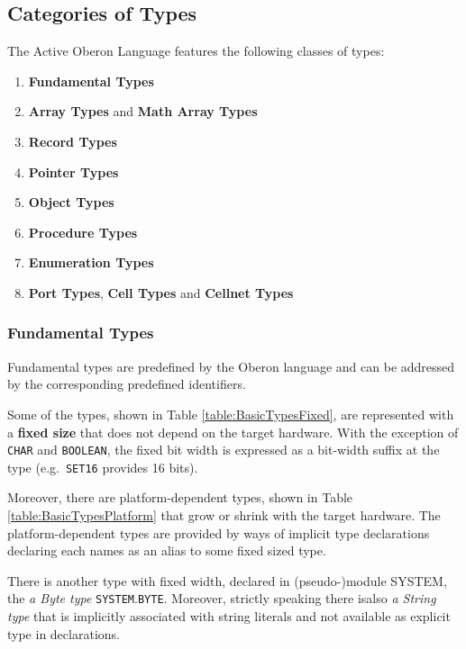\documentclass[a4wide,11pt]{article}
\newcommand{\SYSTEM}{\lstinline"SYSTEM"}
\newcommand{\BYTE}{\lstinline"BYTE"}
\begin{document}
\subsection{Categories of Types}

The Active Oberon Language features the following classes of types:
\begin{enumerate}
\renewcommand{\labelenumi}{(\roman{enumi})}
\item {\bf Fundamental Types}
\item {\bf Array Types} and {\bf Math Array Types}
\item {\bf Record Types}
\item {\bf Pointer  Types}
\item {\bf Object Types}
\item {\bf Procedure Types}
\item {\bf Enumeration Types}
\item {\bf Port Types}, {\bf Cell Types} and {\bf Cellnet Types}
\end{enumerate}

\subsubsection{Fundamental Types}
Fundamental types are predefined by the Oberon language and can be addressed by the corresponding predefined identifiers.

Some of the types, shown in Table \ref{table:BasicTypesFixed}, are represented with a \textbf{fixed size} that does not depend on the target hardware.
With the exception of \verb"CHAR" and \verb"BOOLEAN", the fixed bit width is expressed as a bit-width suffix at the type (e.g.\ \verb"SET16" provides 16 bits).

Moreover, there  are platform-dependent types, shown in Table \ref{table:BasicTypesPlatform} that grow or shrink with the target hardware.
The platform-dependent types are provided by ways of implicit type declarations declaring each names as an alias to some fixed sized type.

There is another type with fixed width, declared in (pseudo-)module SYSTEM, the \emph{a Byte type} \SYSTEM.\BYTE.
Moreover, strictly speaking there isalso  \emph{a String type} that is implicitly associated with string literals and not available as explicit type in declarations.
\end{document}
